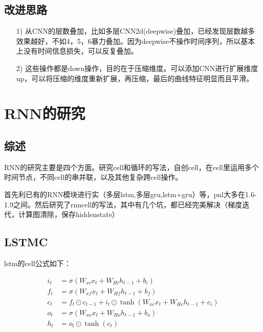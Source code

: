 \documentclass[11pt]{ctexart}
\begin{document}
\subsection{改进思路}
\begin{itemize}
  \item [1)]
  从CNN的层数叠加，比如多层CNN2d(deepwise)叠加，已经发现层数越多效果越好，不如4，5，6暴力叠加。因为deepwise不操作时间序列，所以基本上没有时间信息损失，可以反复叠加。
  \item [2)]
  这些操作都是down操作，目的在于压缩维度。可以添加CNN进行扩展维度up，可以将压缩的维度重新扩展，再压缩，最后的曲线特征明显而且平滑。
\end{itemize}

\section{RNN的研究}
\subsection{综述}
RNN的研究主要是四个方面。研究cell和循环的写法，自创cell，在cell里运用多个时间节点，不同cell的串并联，以及其他复杂跨cell操作。

首先利已有的RNN模块进行实（多层lstm,多层gru,lstm+gru）等，pnl大多在1.6-1.9之间。然后研究了rnncell的写法，其中有几个坑，都已经完美解决（梯度迭代，计算图清除，保存hiddenstate）

\subsection{LSTMC}
lstm的cell公式如下：

\begin{equation}
\begin{split}
    i_t &= \sigma (W_{x i} x_t + W_{H i} h_{t-1} + b_i)\\
    f_t &= \sigma (W_{x f} x_t + W_{H f} h_{t-1} + b_f)\\
    c_t &= f_t \odot c_{t-1} + i_t \odot \tanh (W_{x c} x_t + W_{H c} h_{t-1} + c_i)\\
    o_t &= \sigma (W_{x o} x_t + W_{H o} h_{t-1} + b_o)\\
    h_t &= o_t \odot \tanh(c_t)
\end{split}
\end{equation}
\end{document}
